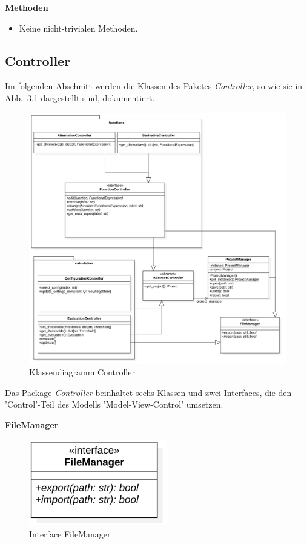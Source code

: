 \documentclass{article}
\begin{document}
\textbf{Methoden}
\begin{itemize}\setlength\itemsep{3em}
\item[] Keine nicht-trivialen Methoden.
\end{itemize}

\newpage
\subsection{Controller}

Im folgenden Abschnitt werden die Klassen des Paketes \emph{Controller}, so wie sie in Abb.~3.1 dargestellt sind, dokumentiert.

\begin{figure}[H]%
    \centering
    \includegraphics[width=13cm]{entwurf/Floriane/ControllerKlassendiagramm.png}
    \caption{Klassendiagramm Controller}
\end{figure}

Das Package \textit{Controller} beinhaltet sechs Klassen und zwei Interfaces, die den 'Control'-Teil des Modells 'Model-View-Control' umsetzen.

\newpage
\textbf{\large{FileManager}}
\begin{figure}[H]%
    \centering
    \includegraphics[width=6cm]{entwurf/Floriane/FileManager.png}
    \caption{Interface FileManager}
\end{figure}
\end{document}
